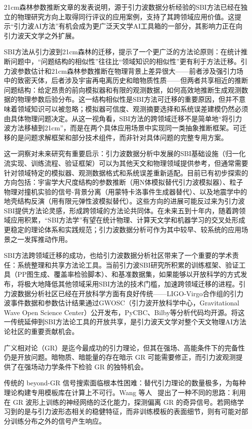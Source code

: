 21cm森林参数推断文章的发表说明，源于引力波数据分析经验的SBI方法已经在独立的物理研究方向上取得同行评议的应用案例，支持了其跨领域应用价值。这提示“引力波AI方法”有机会成为更广泛天文学AI工具箱的一部分，其影响力正在向引力波天文学之外扩展。

SBI方法从引力波到21cm森林的迁移，提示了一个更广泛的方法论原则：在统计推断问题中，“问题结构的相似性”往往比“领域知识的相似性”更有利于方法迁移。引力波参数估计和21cm森林参数推断在物理背景上差异很大——前者涉及强引力场中的致密天体，后者涉及宇宙再电离历史和暗物质性质——但两者共享相近的推断问题结构：给定昂贵的前向模拟器和有限的观测数据，如何高效地推断生成观测数据的物理参数后验分布。这一结构相似性是SBI方法可迁移的重要原因，但并不意味着领域知识可以被忽略；模拟器可信度、观测摘要选择和系统误差建模仍然必须由具体物理问题决定。从这一视角看，SBI方法的跨领域迁移不是简单地“将引力波方法移植到21cm”，而是在两个具体应用场景中实现同一类抽象推断框架。可迁移的是问题求解框架和部分技术组件，而非针对具体问题的完整专用方案。

这一洞察对未来研究有重要启示：引力波数据分析中发展的SBI基础设施（归一化流实现、训练流程、验证框架）可以为其他天文和物理领域提供参考，但通常需要针对领域特定的模拟器、观测数据格式和系统误差重新适配。目前已有初步探索的方向包括：宇宙学大尺度结构的参数推断（用N体模拟替代引力波模拟器）、粒子物理对撞机实验的信号-背景分离（用蒙特卡洛事件生成器替代）、以及地震学中的地壳结构反演（用有限元弹性波模拟替代）。这些方向的进展可能反过来为引力波SBI提供方法论灵感，形成跨领域的方法论共同体。在未来五到十年内，随着跨领域应用积累，“SBI方法学”有望在统计物理、计算天文学和机器学习的交叉处形成更稳定的理论体系和实践规范；引力波数据分析可作为其中较早、较系统的应用场景之一发挥推动作用。

SBI方法跨领域迁移的成功，也给引力波数据分析社区带来了一个重要的学术责任：系统整理和共享方法论工具。当前引力波SBI研究所积累的训练框架、验证工具（PP图生成、覆盖率检验脚本）、和基准数据集，如果能够以开放科学的方式发布，将极大地降低其他领域采用SBI方法的技术门槛，加速跨领域迁移的进程。引力波数据分析社区已经在开放科学方面有良好传统——LIGO-Virgo合作组的引力波事件数据和参数估计结果通过GWOSC（引力波开放科学中心，Gravitational Wave Open Science Center）公开发布，PyCBC、Bilby等分析代码均开源。将这一传统延伸到SBI方法论工具的开放共享，是引力波天文学对整个天文物理AI方法论社区的重要贡献机会。

广义相对论（GR）是迄今最成功的引力理论，但其在强场、高能条件下的完备性仍是开放问题。暗物质、暗能量的存在暗示 GR 可能需要修正，而引力波观测提供了在强场动力学条件下检验 GR 的独特机会。

传统的 beyond-GR 信号搜索面临根本性困难：替代引力理论的数量极多，为每种理论构建专用模板库在计算上不可行。Wang 等人~\cite{wang2025beyondgr} 提出了一种不同的思路：利用在 GR 波形上训练的神经网络的泛化能力，探测偏离 GR 的奇异信号。若网络学习到的是与引力波形态相关的稳健特征，而非训练模板的表面细节，则有可能对部分训练分布之外的信号产生响应。

